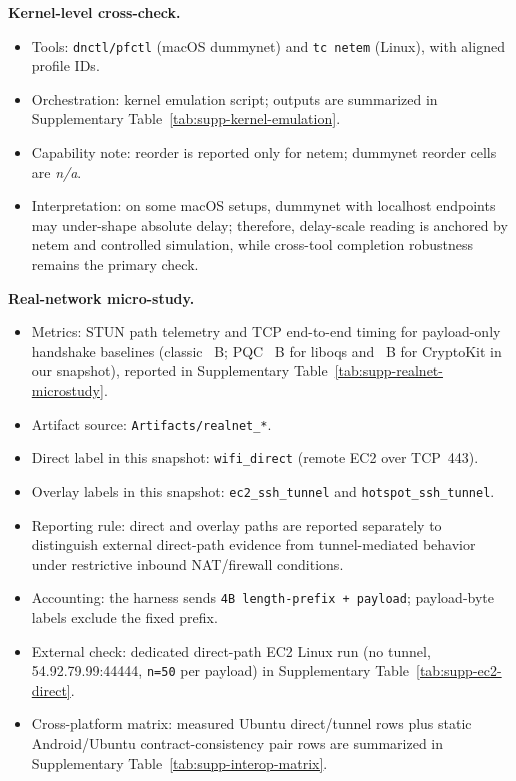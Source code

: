 \documentclass[10pt,journal,compsoc]{IEEEtran}
\providecommand{\tightlist}{%
  \setlength{\itemsep}{0pt}\setlength{\parskip}{0pt}}
\begin{document}
\textbf{Kernel-level cross-check.}
\begin{itemize}\tightlist
\item Tools: \texttt{dnctl/pfctl} (macOS dummynet) and \texttt{tc netem}
(Linux), with aligned profile IDs.
\item Orchestration: kernel emulation script; outputs
are summarized in Supplementary Table~\ref{tab:supp-kernel-emulation}.
\item Capability note: reorder is reported only for netem; dummynet
reorder cells are \textit{n/a}.
\item Interpretation: on some macOS setups, dummynet with localhost
endpoints may under-shape absolute delay; therefore, delay-scale reading
is anchored by netem and controlled simulation, while cross-tool
completion robustness remains the primary check.
\end{itemize}

\textbf{Real-network micro-study.}
\begin{itemize}\tightlist
\item Metrics: STUN path telemetry and TCP end-to-end timing for
payload-only handshake baselines (classic \claimClassicPayloadBytes~B; PQC \claimLiboqsPayloadBytes~B for liboqs and \claimCryptoKitPayloadBytes~B for CryptoKit in our snapshot),
reported in Supplementary Table~\ref{tab:supp-realnet-microstudy}.
\item Artifact source: \texttt{Artifacts/realnet\_*}.
\item Direct label in this snapshot:
\texttt{wifi\_direct} (remote EC2 over TCP~443).
\item Overlay labels in this snapshot:
\texttt{ec2\_ssh\_tunnel} and \texttt{hotspot\_ssh\_tunnel}.
\item Reporting rule: direct and overlay paths are reported separately to
distinguish external direct-path evidence from tunnel-mediated behavior
under restrictive inbound NAT/firewall conditions.
\item Accounting: the harness sends \texttt{4B length-prefix + payload};
payload-byte labels exclude the fixed prefix.
\item External check: dedicated direct-path EC2 Linux run (no tunnel,
54.92.79.99:44444, \texttt{n=50} per payload) in Supplementary
Table~\ref{tab:supp-ec2-direct}.
\item Cross-platform matrix: measured Ubuntu direct/tunnel rows plus
static Android/Ubuntu contract-consistency pair rows are summarized in
Supplementary Table~\ref{tab:supp-interop-matrix}.
\end{itemize}
\end{document}
